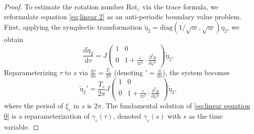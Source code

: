 \documentclass[11pt]{amsart}
\newcommand{\ep}{\varepsilon}
\newcommand{\om}{\varpi}
\begin{document}
\begin{proof}
	To estimate the rotation number $\text{Rot}_{\ep}$ via the trace formula, we reformulate equation \eqref{eq;linear 2} as an anti-periodic boundary value problem. First, applying the symplectic transformation $\tilde{\eta}_{2} = \text{diag}(1/\sqrt{\om}, \sqrt{\om}) \eta_{2}$, we obtain
	\begin{equation*}
		\frac{\mathrm{d}\tilde{\eta}_2}{\mathrm{d}\tau}=J\left({\begin{array}{cc}
				1 & 0\\
				0 & 1+\frac{\ep}{\om^{2}}\cdot\frac{\partial^{2}g}{\partial \varphi^{2}}
		\end{array}}\right)\tilde{\eta}_{2},
	\end{equation*}
	Reparameterizing $\tau$ to $s$ via $\frac{\mathrm{d}\tau}{\mathrm{d}s}=\frac{T_{\ep}}{2\pi}$ (denoting $'=\frac{\mathrm{d}}{\mathrm{d}s}$), the system becomes 
	\begin{equation}\label{eq:linear equation 0}
		\tilde{\eta}_{2}'=\frac{T_{\ep}}{2\pi}J\left({\begin{array}{cc}
				1 & 0\\
				0 & 1+\frac{\ep}{\om^{2}}\cdot\frac{\partial^{2}g}{\partial \varphi^{2}}
		\end{array}}\right)\tilde{\eta}_{2},
	\end{equation}
	where the period of $\xi_{\ep}$ in $s$ is $2\pi$. The fundamental solution of \eqref{eq:linear equation 0} is a reparameterization of $\gamma_{\ep}(\tau)$, denoted $\gamma_{\ep}(s)$ with $s$ as the time variable.
	

\end{proof}
\end{document}

